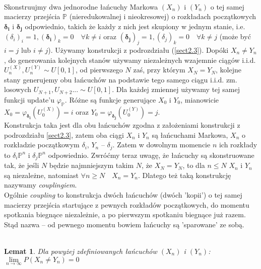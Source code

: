 \documentclass[a4paper]{article}
\theoremstyle{defn}
\theoremstyle{theorem}
\theoremstyle{lemma}
\newtheorem{lemma}[defn]{Lemat}
\theoremstyle{cor}
\theoremstyle{fact}
\begin{document}
\\
Skonstruujmy dwa jednorodne łańcuchy Markowa $(X_n)$ i $(Y_n)$ o tej samej macierzy przejścia $\mathbb{P}$ (nieredukowalnej i nieokresowej) o rozkładach początkowych $\boldsymbol{\delta_i}$ i $\boldsymbol{\delta_j}$ odpowiednio, takich że każdy z nich jest skupiony w jednym stanie, i.e. $(\delta_i)_i = 1, (\boldsymbol{\delta_i})_k = 0 \quad \forall k \neq i$ oraz $(\boldsymbol{\delta_j})_j = 1, (\delta_j)_k = 0 \quad \forall k \neq j$ (może być $i=j$ lub $i\neq j$). Używamy konstrukcji z podrozdziału (\ref{sect2.3}). Dopóki $X_n \neq Y_n$, do generowania kolejnych stanów używamy niezależnych wzajemnie ciągów i.i.d. $U_n^{(X)}, U_n^{(Y)} \sim U[0,1]$, od pierwszego $N$ zaś, przy którym $X_N = Y_N$, kolejne stany generujemy obu łańcuchów na podstawie tego samego ciągu i.i.d. zm. losowych $U_{N+1}, U_{N+2} ... \sim U[0,1]$. Dla każdej zmiennej używamy tej samej funkcji update'u $\varphi_{\mathbb{P}}$. Różne są funkcje generujące $X_0$ i $Y_0$, mianowicie $X_0 = \varphi_{\boldsymbol{\delta_i}}(U_0^{(X)}) = i$ oraz $Y_0 = \varphi_{\boldsymbol{\delta_j}}(U_0^{(Y)}) = j$.\\
Konstrukcja taka jest dla obu łańcuchów zgodna z założeniami konstrukcji z podrozdziału \ref{sect2.3}, zatem oba ciągi $X_n$ i $Y_n$ są łańcuchami Markowa, $X_n$ o rozkładzie początkowym $\delta_i$, $Y_n$ – $\delta_j$. Zatem w dowolnym momencie $n$ ich rozkłady to $\delta_i\mathbb{P}^n$ i $\delta_j\mathbb{P}^n$ odpowiednio. Zwróćmy teraz uwagę, że łańcuchy są skonstruowane tak, że jeśli $N$ będzie najmniejszym takim $N$, że $X_N = Y_N$, to dla $n \leq N$ $X_n$ i $Y_n$ są niezależne, natomiast $\forall n \geq N \quad X_n = Y_n$. Dlatego też taką konstrukcję nazywamy \textit{couplingiem}.\\
Ogólnie \textit{coupling} to konstrukcja dwóch łańcuchów (dwóch 'kopii') o tej samej macierzy przejścia startujące z pewnych rozkładów początkowych, do momentu spotkania biegnące niezależnie, a po pierwszym spotkaniu biegnące już razem. Stąd nazwa – od pewnego momentu bowiem łańcuchy są 'sparowane' ze sobą.
\\
\\
\begin{lemma}\label{lemma2.4.5}
Dla powyżej zdefiniowanych łańcuchów $(X_n)$ i $(Y_n)$: $\lim\limits_{n \to \infty} P(X_n \neq Y_n) = 0$
\end{lemma}
\end{document}
